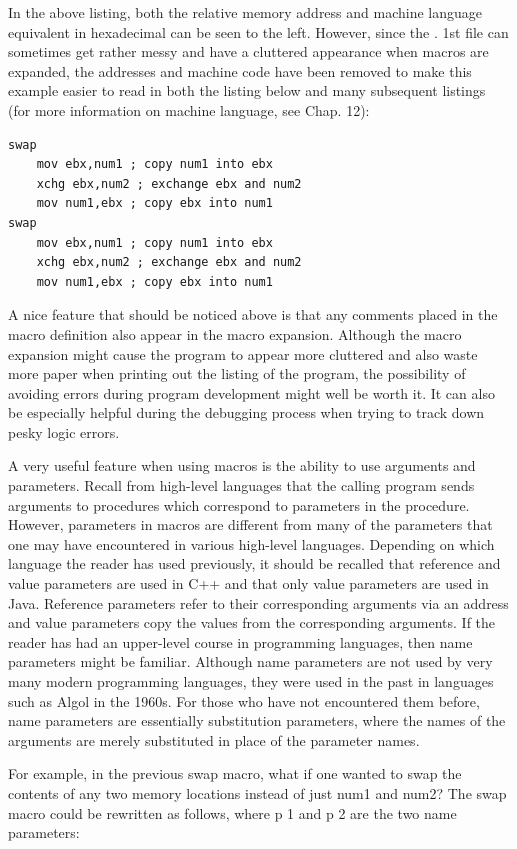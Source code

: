 \documentclass[10pt]{article}
\begin{document}
In the above listing, both the relative memory address and machine language equivalent in hexadecimal can be seen to the left. However, since the . 1st file can sometimes get rather messy and have a cluttered appearance when macros are expanded, the addresses and machine code have been removed to make this example easier to read in both the listing below and many subsequent listings (for more information on machine language, see Chap. 12):

\begin{verbatim}
swap
    mov ebx,num1 ; copy num1 into ebx
    xchg ebx,num2 ; exchange ebx and num2
    mov num1,ebx ; copy ebx into num1
swap
    mov ebx,num1 ; copy num1 into ebx
    xchg ebx,num2 ; exchange ebx and num2
    mov num1,ebx ; copy ebx into num1
\end{verbatim}

A nice feature that should be noticed above is that any comments placed in the macro definition also appear in the macro expansion. Although the macro expansion might cause the program to appear more cluttered and also waste more paper when printing out the listing of the program, the possibility of avoiding errors during program development might well be worth it. It can also be especially helpful during the debugging process when trying to track down pesky logic errors.

A very useful feature when using macros is the ability to use arguments and parameters. Recall from high-level languages that the calling program sends arguments to procedures which correspond to parameters in the procedure. However, parameters in macros are different from many of the parameters that one may have encountered in various high-level languages. Depending on which language the reader has used previously, it should be recalled that reference and value parameters are used in C++ and that only value parameters are used in Java. Reference parameters refer to their corresponding arguments via an address and value parameters copy the values from the corresponding arguments. If the reader has had an upper-level course in programming languages, then name parameters might be familiar. Although name parameters are not used by very many modern programming languages, they were used in the past in languages such as Algol in the 1960s. For those who have not encountered them before, name parameters are essentially substitution parameters, where the names of the arguments are merely substituted in place of the parameter names.

For example, in the previous swap macro, what if one wanted to swap the contents of any two memory locations instead of just num1 and num2? The swap macro could be rewritten as follows, where p 1 and p 2 are the two name parameters:
\end{document}
